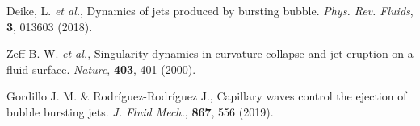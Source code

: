 \documentclass[10pt, a4paper]{article}
\begin{document}
\begin{thebibliography}{9}
        {Deike, L. {\it et al.},}
         Dynamics of jets produced by bursting bubble.
        {\it Phys. Rev. Fluids}, {\bf 3}, 013603 (2018).

        {Zeff B. W. {\it et al.},}
        Singularity dynamics in curvature collapse and jet eruption on a fluid surface.
        {\it Nature}, {\bf 403}, 401 (2000).

Gordillo J. M. \& Rodr\'{i}guez-Rodr\'{i}guez J.,
Capillary waves control  the  ejection  of  bubble  bursting  jets.
{\it J. Fluid Mech.}, {\bf 867}, 556 (2019).







\end{thebibliography}
\end{document}

